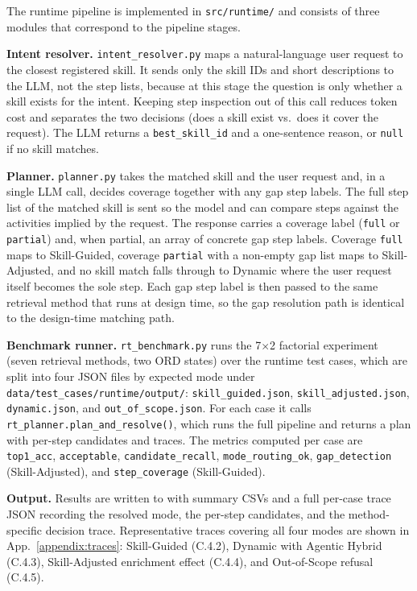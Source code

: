 The runtime pipeline is implemented in \texttt{src/runtime/} and consists of three modules that correspond to the pipeline stages.

\textbf{Intent resolver.} \texttt{intent\_resolver.py} maps a natural-language user request to the closest registered skill. It sends only the skill IDs and short descriptions to the LLM, not the step lists, because at this stage the question is only whether a skill exists for the intent. Keeping step inspection out of this call reduces token cost and separates the two decisions (does a skill exist vs.\ does it cover the request). The LLM returns a \texttt{best\_skill\_id} and a one-sentence reason, or \texttt{null} if no skill matches.

\textbf{Planner.} \texttt{planner.py} takes the matched skill and the user request and, in a single LLM call, decides coverage together with any gap step labels. The full step list of the matched skill is sent so the model and can compare steps against the activities implied by the request. The response carries a coverage label (\texttt{full} or \texttt{partial}) and, when partial, an array of concrete gap step labels. Coverage \texttt{full} maps to Skill-Guided, coverage \texttt{partial} with a non-empty gap list maps to Skill-Adjusted, and no skill match falls through to Dynamic where the user request itself becomes the sole step. Each gap step label is then passed to the same retrieval method that runs at design time, so the gap resolution path is identical to the design-time matching path.

\textbf{Benchmark runner.} \texttt{rt\_benchmark.py} runs the 7$\times$2 factorial experiment (seven retrieval methods, two ORD states) over the runtime test cases, which are split into four JSON files by expected mode under \texttt{data/test\_cases/runtime/output/}: \texttt{skill\_guided.json}, \texttt{skill\_adjusted.json}, \texttt{dynamic.json}, and \texttt{out\_of\_scope.json}. For each case it calls \texttt{rt\_planner.plan\_and\_resolve()}, which runs the full pipeline and returns a plan with per-step candidates and traces. The metrics computed per case are \texttt{top1\_acc}, \texttt{acceptable}, \texttt{candidate\_recall}, \texttt{mode\_routing\_ok}, \texttt{gap\_detection} (Skill-Adjusted), and \texttt{step\_coverage} (Skill-Guided).

\textbf{Output.} Results are written to  with summary CSVs and a full per-case trace JSON recording the resolved mode, the per-step candidates, and the method-specific decision trace. Representative traces covering all four modes are shown in App.~\ref{appendix:traces}: Skill-Guided (C.4.2), Dynamic with Agentic Hybrid (C.4.3), Skill-Adjusted enrichment effect (C.4.4), and Out-of-Scope refusal (C.4.5).

